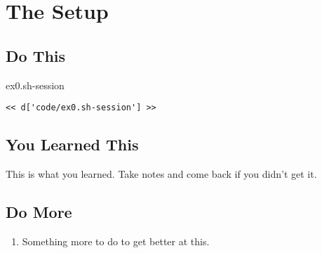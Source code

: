 \chapter{The Setup}

\section{Do This}

\begin{code}{ex0.sh-session}
\begin{Verbatim}
<< d['code/ex0.sh-session'] >>
\end{Verbatim}
\end{code}


\section{You Learned This}

This is what you learned.  Take notes and come back if you didn't get it.

\section{Do More}

\begin{enumerate}
\item Something more to do to get better at this.
\end{enumerate}

